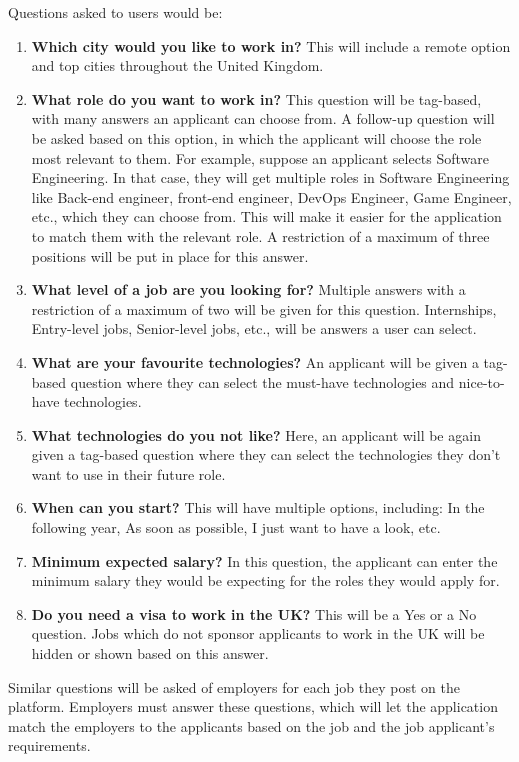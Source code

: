 Questions asked to users would be:
\begin{enumerate}
    \item \textbf{Which city would you like to work in?} This will include a remote option and top cities throughout the United Kingdom.
    \item \textbf{What role do you want to work in?} This question will be tag-based, with many answers an applicant can choose from. A follow-up question will be asked based on this option, in which the applicant will choose the role most relevant to them. For example, suppose an applicant selects Software Engineering. In that case, they will get multiple roles in Software Engineering like Back-end engineer, front-end engineer, DevOps Engineer, Game Engineer, etc., which they can choose from. This will make it easier for the application to match them with the relevant role. A restriction of a maximum of three positions will be put in place for this answer.
    \item \textbf{What level of a job are you looking for?} Multiple answers with a restriction of a maximum of two will be given for this question. Internships, Entry-level jobs, Senior-level jobs, etc., will be answers a user can select.
    \item \textbf{What  are your favourite technologies?} An applicant will be given a tag-based question where they can select the must-have technologies and nice-to-have technologies. 
    \item \textbf{What technologies do you not like?} Here, an applicant will be again given a tag-based question where they can select the technologies they don't want to use in their future role.
    \item \textbf{When can you start?} This will have multiple options, including: In the following year, As soon as possible, I just want to have a look, etc.
    \item \textbf{Minimum expected salary?} In this question, the applicant can enter the minimum salary they would be expecting for the roles they would apply for. 
    \item \textbf{Do you need a visa to work in the UK?} This will be a Yes or a No question. Jobs which do not sponsor applicants to work in the UK will be hidden or shown based on this answer.
\end{enumerate}

Similar questions will be asked of employers for each job they post on the platform. Employers must answer these questions, which will let the application match the employers to the applicants based on the job and the job applicant's requirements. 

